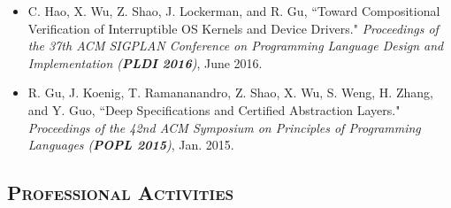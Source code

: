 \documentclass[10pt]{article}
\renewcommand{\section}[1]{
	\vspace{-5pt}
   	\subsection*{\scshape  \bfseries #1}
   }
\newenvironment{innerlist}[1][\enskip\textbullet]%
        {\begin{itemize}[#1,leftmargin=25pt,parsep=0pt,itemsep=2pt,topsep=2pt,partopsep=0pt]}
        {\end{itemize}}
\begin{document}
\begin{innerlist}
\vspace{.1in}


\item[] C. Hao, X. Wu, Z. Shao, J. Lockerman, and R. Gu, ``Toward Compositional Verification of Interruptible OS Kernels and Device Drivers." \emph{Proceedings of the 37th ACM SIGPLAN Conference on Programming Language Design and Implementation (\textbf{PLDI 2016})}, June 2016.

\vspace{.1in}

\item[] R. Gu, J. Koenig, T. Ramananandro, Z. Shao, X. Wu, S. Weng, H. Zhang, and Y. Guo, ``Deep Specifications and Certified Abstraction Layers." \emph{Proceedings of the 42nd ACM Symposium on Principles of Programming Languages (\textbf{POPL 2015})}, Jan. 2015.

\end{innerlist}

\section{Professional Activities}
\end{document}

